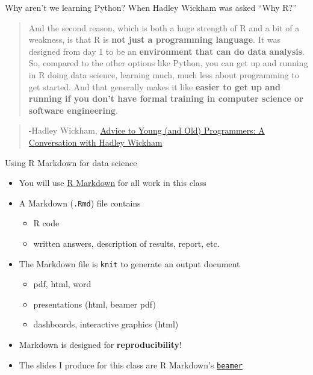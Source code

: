 \documentclass[
  10pt,
  ignorenonframetext,
]{beamer}
\providecommand{\tightlist}{%
  \setlength{\itemsep}{0pt}\setlength{\parskip}{0pt}}
\begin{document}
\begin{frame}{Why aren't we learning Python?}
\protect\hypertarget{why-arent-we-learning-python}{}
When Hadley Wickham was asked ``Why R?''

\vspace*{0.5in}

\begin{quote}
And the second reason, which is both a huge strength of R and a bit of a
weakness, is that R is \textbf{not just a programming language}. It was
designed from day 1 to be an \textbf{environment that can do data
analysis}. So, compared to the other options like Python, you can get up
and running in R doing data science, learning much, much less about
programming to get started. And that generally makes it like
\textbf{easier to get up and running if you don't have formal training
in computer science or software engineering}.
\end{quote}

\begin{quote}
-Hadley Wickham,
\href{https://www.r-bloggers.com/advice-to-young-and-old-programmers-a-conversation-with-hadley-wickham/}{Advice
to Young (and Old) Programmers: A Conversation with Hadley Wickham}
\end{quote}
\end{frame}

\begin{frame}[fragile]{Using R Markdown for data science}
\protect\hypertarget{using-r-markdown-for-data-science}{}
\begin{itemize}
\tightlist
\item
  You will use \href{http://rmarkdown.rstudio.com/lesson-1.html}{R
  Markdown} for all work in this class
\item
  A Markdown (\texttt{.Rmd}) file contains

  \begin{itemize}
  \tightlist
  \item
    R code
  \item
    written answers, description of results, report, etc.
  \end{itemize}
\item
  The Markdown file is \texttt{knit} to generate an output document

  \begin{itemize}
  \tightlist
  \item
    pdf, html, word
  \item
    presentations (html, beamer pdf)
  \item
    dashboards, interactive graphics (html)
  \end{itemize}
\item
  Markdown is designed for \textbf{reproducibility}!
\item
  The slides I produce for this class are R Markdown's
  \href{http://rmarkdown.rstudio.com/beamer_presentation_format.html}{\texttt{beamer}}
\end{itemize}
\end{frame}
\end{document}
